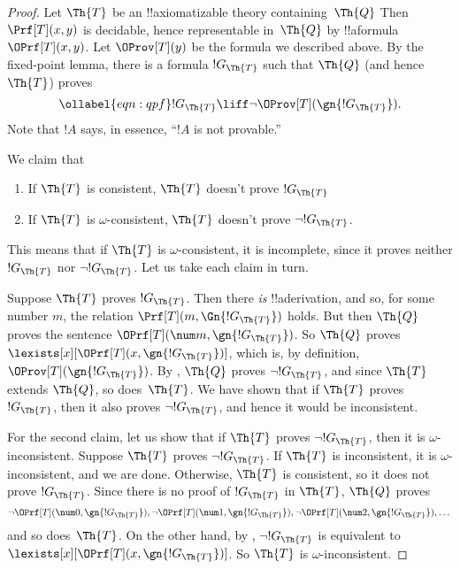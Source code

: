 \documentclass[../../../include/open-logic-section]{subfiles}
\begin{document}
\begin{proof}
Let $\Th{T}$ be an !!{axiomatizable} theory containing~$\Th{Q}$ Then
$\Prf[T](x, y)$ is decidable, hence representable in~$\Th{Q}$ by
!!a{formula}~$\OPrf[T](x, y)$. Let $\OProv[T](y)$ be the formula we
described above. By the fixed-point lemma, there is a formula
$!G_\Th{T}$ such that $\Th{Q}$ (and hence $\Th{T}$) proves
\begin{equation}
\ollabel{eqn:qpf}
!G_\Th{T} \liff \lnot \OProv[T](\gn{!G_\Th{T}}).
\end{equation}
Note that $!A$ says, in essence, ``$!A$ is not provable.''

We claim that
\begin{enumerate}
\item If $\Th{T}$ is consistent, $\Th{T}$ doesn't prove $!G_\Th{T}$
\item If $\Th{T}$ is $\omega$-consistent, $\Th{T}$ doesn't prove
  $\lnot !G_\Th{T}$.
\end{enumerate}
This means that if $\Th{T}$ is $\omega$-consistent, it is incomplete,
since it proves neither $!G_\Th{T}$ nor $\lnot !G_\Th{T}$. Let us take
each claim in turn.

Suppose $\Th{T}$ proves $!G_\Th{T}$. Then there \emph{is}
!!a{derivation}, and so, for some number $m$, the relation $\Prf[T](m,
\Gn{!G_\Th{T}})$ holds. But then $\Th{Q}$ proves the sentence
$\OPrf[T](\num m, \gn{!G_\Th{T}})$. So $\Th{Q}$ proves
$\lexists[x][\OPrf[T](x,\gn{!G_\Th{T}})]$, which is, by definition,
$\OProv[T](\gn{!G_\Th{T}})$. By , $\Th{Q}$ proves
$\lnot !G_\Th{T}$, and since $\Th{T}$ extends $\Th{Q}$, so
does~$\Th{T}$. We have shown that if $\Th{T}$ proves $!G_\Th{T}$, then
it also proves $\lnot !G_\Th{T}$, and hence it would be inconsistent.

For the second claim, let us show that if $\Th{T}$ proves $\lnot
!G_\Th{T}$, then it is $\omega$-inconsistent. Suppose $\Th{T}$ proves
$\lnot !G_\Th{T}$. If $\Th{T}$ is inconsistent, it is
$\omega$-inconsistent, and we are done. Otherwise, $\Th{T}$ is
consistent, so it does not prove $!G_\Th{T}$. Since there is no proof
of $!G_\Th{T}$ in $\Th{T}$, $\Th{Q}$ proves
\[
\lnot \OPrf[T](\num 0, \gn{!G_\Th{T}}), \lnot \OPrf[T](\num 1,
\gn{!G_\Th{T}}), \lnot \OPrf[T](\num 2, \gn{!G_\Th{T}}), \dots
\]
and so does~$\Th{T}$.  On the other hand, by , $\lnot
!G_\Th{T}$ is equivalent to
$\lexists[x][\OPrf[T](x,\gn{!G_\Th{T}})]$. So $\Th{T}$ is
$\omega$-inconsistent.
\end{proof}
\end{document}
